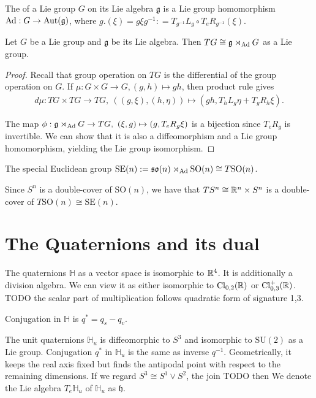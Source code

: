 \documentclass[12pt,class=article,crop=false]{standalone}
\begin{document}
\begin{defn}
The  of a Lie group $ G$ on its Lie algebra  $ \mathfrak{ g}$ is a Lie group homomorphism $ \operatorname{Ad}: G \to \operatorname{Aut}( \mathfrak{ g})$, where $ g.( \xi) = g \xi g^{-1} : = T_{g^{-1}} L_g \circ T_e R_{g^{-1}} (\xi)$.


\end{defn}

\begin{prop}
Let $ G$ be a Lie group and  $ \mathfrak{ g }$ be its Lie algebra. Then $ TG \cong \mathfrak{ g} \rtimes_{ \operatorname{Ad}} G$ as a Lie group.
\end{prop}

\begin{proof}
Recall that group operation on $ TG$ is the differential of the group operation on  $ G$. If $ \mu: G \times G \to G, (g,h) \mapsto gh$, then product rule gives
\begin{align*}
	d\mu : TG \times TG \to TG,\ ((g, \xi) , (h, \eta)) \mapsto (gh, T_hL_g \eta + T_g R_h \xi).
\end{align*}

The map $ \phi: \mathfrak{ g} \rtimes_{ \operatorname{Ad}} G \to TG,\ (\xi,g) \mapsto (g,T_eR_g \xi)$ is a bijection since $ T_e R_g$ is invertible. We can show that it is also a diffeomorphism and a Lie group homomorphism, yielding the Lie group isomorphism.
\end{proof}

\begin{coro}
The special Euclidean group $ \text{SE}( n) := \mathfrak{ so }(n) \rtimes_{\operatorname{Ad}} \text{SO}( n) \cong T \text{SO}( n) $. 
\end{coro}

Since $ S^{n}$ is a double-cover of $ \text{SO}( n) $, we have that $ TS^{n} \cong \mathbb{R}^{n} \times S^{n}$ is a double-cover of $ T \text{SO}( n) \cong \text{SE}( n) $.
\section{The Quaternions and its dual}
The quaternions $ \mathbb{H}$ as a vector space is isomorphic to $ \mathbb{R}^{4}$. It is additionally a division algebra. We can view it as either isomorphic to $ \operatorname{Cl}_{0,2} ( \mathbb{R}) $ or $ \operatorname{Cl}_{ 0 ,3}^{+} ( \mathbb{R})$. TODO the scalar part of multiplication follows quadratic form of signature 1,3.

Conjugation in $ \mathbb{H}$ is $ q^* = q_s - q_v$. 

The unit quaternions $ \mathbb{H}_u$ is diffeomorphic to $ S^3$ and isomorphic to $ \text{SU}(2) $ as a Lie group. Conjugation $ q^* $ in $ \mathbb{H}_u$ is the same as inverse $ q^{-1}$. Geometrically, it keeps the real axis fixed but finds the antipodal point with respect to the remaining dimensions. If we regard $ S^3 \cong S^{1} \vee S^{2}$, the join TODO then 
We denote the Lie algebra $ T_e \mathbb{H}_u$ of $ \mathbb{H}_u$ as $ \mathfrak{ h}$.
\end{document}

